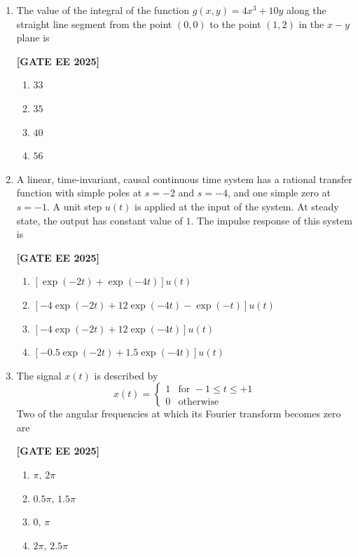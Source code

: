 \documentclass[12pt]{article}
\begin{document}
\begin{enumerate}[leftmargin=*, label=\textbf{Q.\arabic*:}]
\item The value of the integral of the function $g(x, y) = 4x^3 + 10y$ along the straight line segment from the point $(0,0)$ to the point $(1,2)$ in the $x-y$ plane is
 
\noindent \textbf{[GATE EE 2025]}
\begin{multicols}{4}
\begin{enumerate}
    \item $33$
    \item $35$
    \item $40$
    \item $56$
\end{enumerate}
\end{multicols}

\item A linear, time-invariant, causal continuous time system has a rational transfer function with simple poles at $s=-2$ and $s= -4$, and one simple zero at $s=-1$. A unit step $u(t)$ is applied at the input of the system. At steady state, the output has constant value of $1$. The impulse response of this system is
 
\noindent \textbf{[GATE EE 2025]}
\begin{enumerate}
    \item $\left[\exp(-2t)+\exp(-4t) \right]u(t)$
    \item $\left[ -4\exp(-2t) + 12\exp(-4t) -\exp(-t) \right]u(t)$
    \item $\left[ -4\exp(-2t) + 12\exp(-4t) \right]u(t)$
    \item $\left[ -0.5\exp(-2t) + 1.5\exp(-4t) \right]u(t)$
\end{enumerate}

\item The signal $x(t)$ is described by
\[
x(t) = \begin{cases}
1 & \text{for } -1 \leq t \leq +1 \\
0 & \text{otherwise}
\end{cases}
\]
Two of the angular frequencies at which its Fourier transform becomes zero are
 
\noindent \textbf{[GATE EE 2025]}
\begin{multicols}{4}
\begin{enumerate}
    \item $\pi,\,2\pi$
    \item $0.5\pi,\,1.5\pi$
    \item $0,\,\pi$
    \item $2\pi,\,2.5\pi$
\end{enumerate}
\end{multicols}


\end{enumerate}
\end{document}
